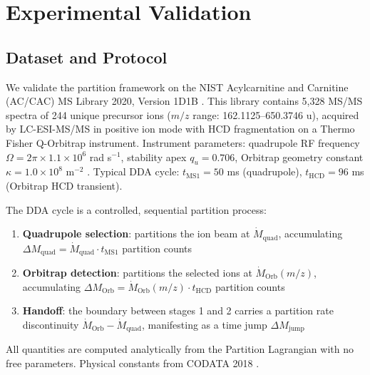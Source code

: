 \documentclass[11pt,twocolumn,a4paper]{article}
\theoremstyle{plain}
\theoremstyle{definition}
\theoremstyle{remark}
\begin{document}

\section{Experimental Validation}
\label{sec:experiment}

\subsection{Dataset and Protocol}
\label{subsec:dataset}

We validate the partition framework on the NIST Acylcarnitine and Carnitine
(AC/CAC) MS Library 2020, Version 1D1B \cite{nist_accac_2020}. This library
contains 5,328 MS/MS spectra of 244 unique precursor ions ($m/z$ range:
162.1125--650.3746 u), acquired by LC-ESI-MS/MS in positive ion mode with HCD
fragmentation on a Thermo Fisher Q-Orbitrap instrument. Instrument parameters:
quadrupole RF frequency $\Omega = 2\pi \times 1.1 \times 10^6$ rad s$^{-1}$,
stability apex $q_u = 0.706$, Orbitrap geometry constant $\kappa = 1.0 \times
10^8$ m$^{-2}$ \cite{makarov2000}. Typical DDA cycle: $t_{\mathrm{MS1}} = 50$
ms (quadrupole), $t_{\mathrm{HCD}} = 96$ ms (Orbitrap HCD transient).

The DDA cycle is a controlled, sequential partition process:
\begin{enumerate}
    \item \textbf{Quadrupole selection}: partitions the ion beam at
          $\dot{M}_{\mathrm{quad}}$, accumulating $\Delta M_{\mathrm{quad}} =
          \dot{M}_{\mathrm{quad}} \cdot t_{\mathrm{MS1}}$ partition counts
    \item \textbf{Orbitrap detection}: partitions the selected ions at
          $\dot{M}_{\mathrm{Orb}}(m/z)$, accumulating $\Delta M_{\mathrm{Orb}}
          = \dot{M}_{\mathrm{Orb}}(m/z) \cdot t_{\mathrm{HCD}}$ partition counts
    \item \textbf{Handoff}: the boundary between stages 1 and 2 carries a
          partition rate discontinuity $\dot{M}_{\mathrm{Orb}} -
          \dot{M}_{\mathrm{quad}}$, manifesting as a time jump $\Delta
          M_{\mathrm{jump}}$
\end{enumerate}

All quantities are computed analytically from the Partition Lagrangian with no
free parameters. Physical constants from CODATA 2018 \cite{codata2018}.
\end{document}
